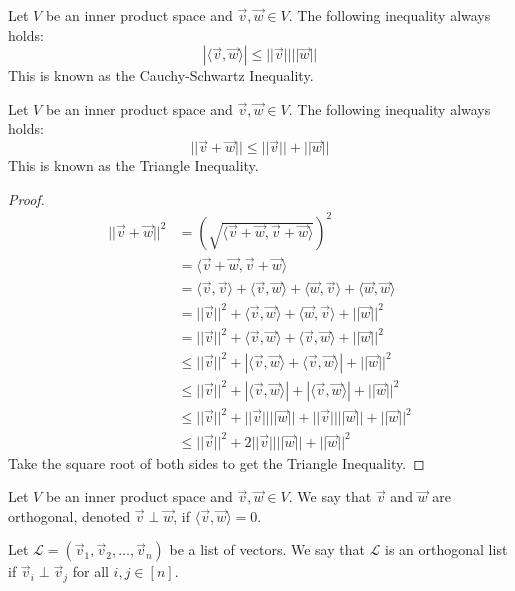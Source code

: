 \begin{theorem}
    Let $V$ be an inner product space and $\vec{v},\vec{w}\in V$. The following inequality always holds:
    $$|\langle\vec{v},\vec{w}\rangle|\leq||\vec{v}||||\vec{w}||$$
    This is known as the Cauchy-Schwartz Inequality.
\end{theorem}
\begin{theorem}
    Let $V$ be an inner product space and $\vec{v},\vec{w}\in V$. The following inequality always holds:
    $$||\vec{v}+\vec{w}||\leq||\vec{v}||+||\vec{w}||$$
    This is known as the Triangle Inequality.
\end{theorem}
\begin{proof}
    \begin{align*}
        ||\vec{v}+\vec{w}||^2&=(\sqrt{\langle\vec{v}+\vec{w},\vec{v}+\vec{w}\rangle})^2\\
        &=\langle\vec{v}+\vec{w},\vec{v}+\vec{w}\rangle\\
        &=\langle\vec{v},\vec{v}\rangle+\langle\vec{v},\vec{w}\rangle+\langle\vec{w},\vec{v}\rangle+\langle\vec{w},\vec{w}\rangle\tag{by Linearity of Inner Product}\\
        &=||\vec{v}||^2+\langle\vec{v},\vec{w}\rangle+\langle\vec{w},\vec{v}\rangle+||\vec{w}||^2\\
        &=||\vec{v}||^2+\langle\vec{v},\vec{w}\rangle+\langle\vec{v},\vec{w}\rangle+||\vec{w}||^2\tag{by Symmetry of Inner Product}\\
        &\leq||\vec{v}||^2+|\langle\vec{v},\vec{w}\rangle+\langle\vec{v},\vec{w}\rangle|+||\vec{w}||^2\\
        &\leq||\vec{v}||^2+|\langle\vec{v},\vec{w}\rangle|+|\langle\vec{v},\vec{w}\rangle|+||\vec{w}||^2\\
        &\leq||\vec{v}||^2+||\vec{v}||||\vec{w}||+||\vec{v}||||\vec{w}||+||\vec{w}||^2\tag{by Cauchy Schwartz Inequality}\\
        &\leq||\vec{v}||^2+2||\vec{v}||||\vec{w}||+||\vec{w}||^2
    \end{align*}
    Take the square root of both sides to get the Triangle Inequality.
\end{proof}
\begin{definition}
    Let $V$ be an inner product space and $\vec{v},\vec{w}\in V$. We say that $\vec{v}$ and $\vec{w}$ are orthogonal, denoted $\vec{v}\perp\vec{w}$, if $\langle\vec{v},\vec{w}\rangle=0$.
\end{definition}
\begin{definition}
    Let $\mathcal{L}=(\vec{v}_1,\vec{v}_2,\ldots,\vec{v}_n)$ be a list of vectors. We say that $\mathcal{L}$ is an orthogonal list if $\vec{v}_i\perp\vec{v}_j$ for all $i,j\in [n]$.
\end{definition}
